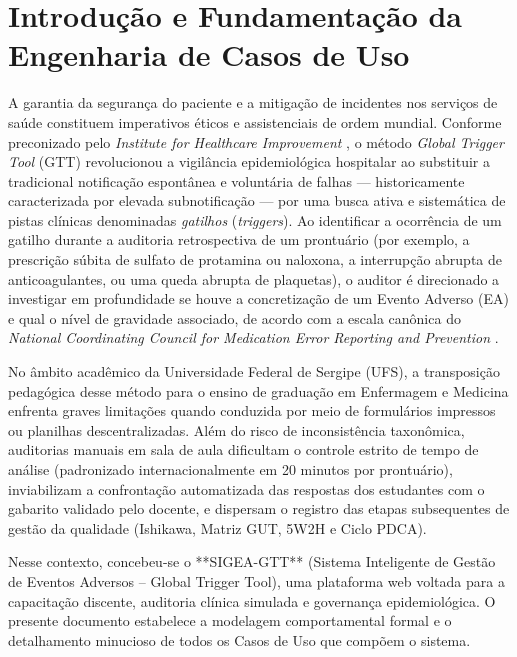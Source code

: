 \chapter{Introdução e Fundamentação da Engenharia de Casos de Uso}
\label{cap_introducao_fundamentacao}

A garantia da segurança do paciente e a mitigação de incidentes nos serviços de saúde constituem imperativos éticos e assistenciais de ordem mundial. Conforme preconizado pelo \textit{Institute for Healthcare Improvement} \cite{ihi2009}, o método \textit{Global Trigger Tool} (GTT) revolucionou a vigilância epidemiológica hospitalar ao substituir a tradicional notificação espontânea e voluntária de falhas --- historicamente caracterizada por elevada subnotificação --- por uma busca ativa e sistemática de pistas clínicas denominadas \textit{gatilhos} (\textit{triggers}). Ao identificar a ocorrência de um gatilho durante a auditoria retrospectiva de um prontuário (por exemplo, a prescrição súbita de sulfato de protamina ou naloxona, a interrupção abrupta de anticoagulantes, ou uma queda abrupta de plaquetas), o auditor é direcionado a investigar em profundidade se houve a concretização de um Evento Adverso (EA) e qual o nível de gravidade associado, de acordo com a escala canônica do \textit{National Coordinating Council for Medication Error Reporting and Prevention} \cite{nccmerp2001}.

No âmbito acadêmico da Universidade Federal de Sergipe (UFS), a transposição pedagógica desse método para o ensino de graduação em Enfermagem e Medicina enfrenta graves limitações quando conduzida por meio de formulários impressos ou planilhas descentralizadas. Além do risco de inconsistência taxonômica, auditorias manuais em sala de aula dificultam o controle estrito de tempo de análise (padronizado internacionalmente em 20 minutos por prontuário), inviabilizam a confrontação automatizada das respostas dos estudantes com o gabarito validado pelo docente, e dispersam o registro das etapas subsequentes de gestão da qualidade (Ishikawa, Matriz GUT, 5W2H e Ciclo PDCA).

Nesse contexto, concebeu-se o **SIGEA-GTT** (Sistema Inteligente de Gestão de Eventos Adversos -- Global Trigger Tool), uma plataforma web voltada para a capacitação discente, auditoria clínica simulada e governança epidemiológica. O presente documento estabelece a modelagem comportamental formal e o detalhamento minucioso de todos os Casos de Uso que compõem o sistema.

